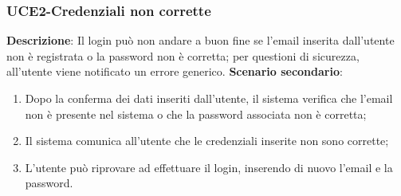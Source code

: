 \subsubsection{UCE2-Credenziali non corrette}
\textbf{Descrizione}: Il login può non andare a buon fine se l'email inserita dall'utente non è registrata
o la password non è corretta; per questioni di sicurezza, all'utente viene notificato un errore generico.
\textbf{Scenario secondario}:

\begin{enumerate}
\item Dopo la conferma dei dati inseriti dall'utente, il sistema verifica che l'email non è presente nel sistema o che la password associata non è corretta;
\item Il sistema comunica all'utente che le credenziali inserite non sono corrette;
\item L'utente può riprovare ad effettuare il login, inserendo di nuovo l'email e la password.
\end{enumerate}
